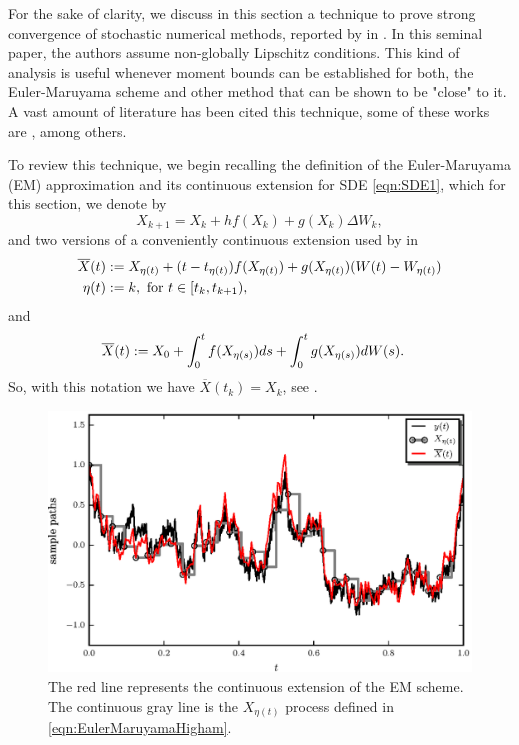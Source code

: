 	For the sake of clarity,  we discuss in this section a technique to prove strong convergence of stochastic
numerical methods, reported  by  \citeauthor*{Higham2002b} in \cite{Higham2002b}.
In this seminal paper, the authors assume non-globally Lipschitz conditions.
This kind of analysis is useful whenever moment bounds can be established for both, the Euler-Maruyama scheme and 
other method that can be shown to be "close" to it. A vast amount of literature has been cited this 
technique, some of these works are
\cite{Beyn2010, Guo2014, Hutzenthaler2015, Hutzenthaler2012a,Hutzenthaler2010,Lamba2007,Mao2013,Tretyakov2013}, among
others.

	To review this technique, we begin  recalling the definition of the Euler-Maruyama (EM) approximation
	and its continuous extension for SDE 
\eqref{eqn:SDE1}, which for this section, we denote by
\begin{equation}\label{eqn:EulerMaruyamaHigham}
	X_{k+1}= X_k+
		hf(X_k) + g(X_k)\Delta W_k,
\end{equation}
and two versions of a conveniently continuous extension used by
\citeauthor{Higham2002b} in \cite{Higham2002b} 
\begin{align}\label{eqn:EMContinuousExtension}
	\overline{X}(t)&:=
		X_{\eta(t)} + (t-t_{\eta(t)}) f(X_{\eta(t)}) + g(X_{\eta(t)})(W(t)-W_{\eta(t)})\\
		\eta(t)&:=
			 k, \text{ for } t\in[t_k,t_{k+1}), \notag
\end{align}
and
\begin{align}
		\overline{X}(t)
		&:=
			X_0 + \int_{0}^t f(X_{\eta(s)})ds + 
			\int_0^tg(X_{\eta(s)})dW(s). \notag \label{eqn:EMIntegralContinuousExtension}
	\end{align}
So, with this notation we have $\overline{X}(t_k)=X_k$, see .
%
\begin{figure}[h!]
	\centering
	\includegraphics{papers/paperB/sections/ContinuousExtPy/ContinuousExtension.eps}
	\caption{
		The red line represents the continuous extension of the EM scheme. The continuous gray line is the $X_{\eta(t)}$ 
		process defined in \eqref{eqn:EulerMaruyamaHigham}.
	}
	\label{fig:ContinuousExtension}
\end{figure}

